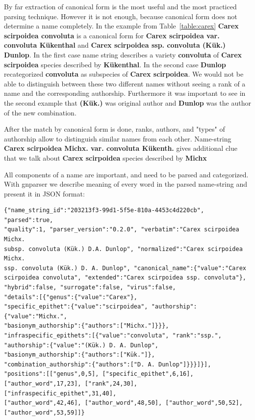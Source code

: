 \documentclass{bmcart}
\begin{document}
By far extraction of canonical form is the most useful and the most practiced
parsing technique. However it is not enough, because canonical form does not
determine a name completely. In the example from Table~\ref{table:carex}
\textbf{Carex scirpoidea convoluta} is a canonical form for \textbf{Carex
scirpoidea var. convoluta Kükenthal} and \textbf{Carex scirpoidea ssp.
convoluta (Kük.) Dunlop}. In the first case name string describes a variety
\textbf{convoluta} of \textbf{Carex scirpoidea} species described by
\textbf{Kükenthal}. In the second case \textbf{Dunlop} recategorized \textbf
{convoluta} as subspecies of \textbf{Carex scirpoidea}. We would not be able
to distinguish between these two different names without seeing a rank of a
name and the corresponding authorship. Furthermore it was important to see in
the second example that \textbf{(Kük.)} was original author and
\textbf{Dunlop} was the author of the new combination.

After the match by canonical form is done, ranks, authors, and "types" of
authorship allow to distinguish similar names from each other.
Name-string \textbf{Carex scirpoidea Michx. var. convoluta Kükenth.} gives
additional clue that we talk about \textbf{Carex scirpoidea} species described
by \textbf{Michx}

All components of a name are important, and need to be parsed and categorized.
With gnparser we describe meaning of every word in the parsed name-string
and present it in JSON format:


\vspace{0.5cm}
\begin{Verbatim}[fontsize=\small]
{"name_string_id":"203213f3-99d1-5f5e-810a-4453c4d220cb", "parsed":true,
"quality":1, "parser_version":"0.2.0", "verbatim":"Carex scirpoidea Michx.
subsp. convoluta (Kük.) D.A. Dunlop", "normalized":"Carex scirpoidea Michx.
ssp. convoluta (Kük.) D. A. Dunlop", "canonical_name":{"value":"Carex
scirpoidea convoluta", "extended":"Carex scirpoidea ssp. convoluta"},
"hybrid":false, "surrogate":false, "virus":false,
"details":[{"genus":{"value":"Carex"},
"specific_epithet":{"value":"scirpoidea", "authorship":{"value":"Michx.",
"basionym_authorship":{"authors":["Michx."]}}},
"infraspecific_epithets":[{"value":"convoluta", "rank":"ssp.",
"authorship":{"value":"(Kük.) D. A. Dunlop",
"basionym_authorship":{"authors":["Kük."]},
"combination_authorship":{"authors":["D. A. Dunlop"]}}}]}],
"positions":[["genus",0,5], ["specific_epithet",6,16],
["author_word",17,23], ["rank",24,30], ["infraspecific_epithet",31,40],
["author_word",42,46], ["author_word",48,50], ["author_word",50,52],
["author_word",53,59]]}
\end{Verbatim}
\vspace{0.5cm}
\end{document}
